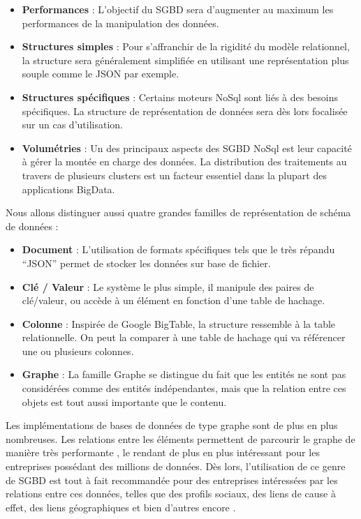 \documentclass[a4paper,fleqn,12pt,oneside]{book}
\begin{document}
\begin{itemize}
\item \textbf{Performances} : L'objectif du SGBD sera d'augmenter au maximum les performances de la manipulation des données. 
\item \textbf{Structures simples} : Pour s’affranchir de la rigidité du modèle relationnel, la structure sera généralement simplifiée en utilisant une représentation plus souple comme le JSON par exemple.
\item \textbf{Structures spécifiques} : Certains moteurs NoSql sont liés à des besoins spécifiques. La structure de représentation de données sera dès lors focalisée sur un cas d'utilisation.
\item \textbf{Volumétries} : Un des principaux aspects des SGBD NoSql est leur capacité à gérer la montée en charge des données. La distribution des traitements au travers de plusieurs clusters est un facteur essentiel dans la plupart des applications BigData.
\end{itemize} 

Nous allons distinguer aussi quatre grandes familles de représentation de schéma de données :

\begin{itemize}
\item \textbf{Document} : L'utilisation de formats spécifiques tels que le très répandu \enquote{JSON} permet de stocker les données sur base de fichier.
\item \textbf{Clé / Valeur }: Le système le plus simple, il manipule des paires de clé/valeur, ou accède à un élément en fonction d'une table de hachage.
\item \textbf{Colonne} : Inspirée de Google BigTable, la structure ressemble à la table relationnelle. On peut la comparer à une table de hachage qui va référencer une ou plusieurs colonnes.
\item \textbf{Graphe} : La famille Graphe se distingue du fait que les entités ne sont pas considérées comme des entités indépendantes, mais que la relation entre ces objets est tout aussi importante que le contenu.
\end{itemize} 

Les implémentations de bases de données de type graphe sont de plus en plus nombreuses. Les relations entre les éléments permettent de parcourir le graphe de manière très performante \cite{vicknair2010comparison}, le rendant de plus en plus intéressant pour les entreprises possédant des millions de données. Dès lors, l'utilisation de ce genre de SGBD est tout à fait recommandée pour des entreprises intéressées par les relations entre ces données, telles que des profils sociaux, des liens de cause à effet, des liens géographiques et bien d’autres encore \cite{infoqSite}\cite{NoSqlDef}\cite{bruchez2016bases}.
\end{document}
